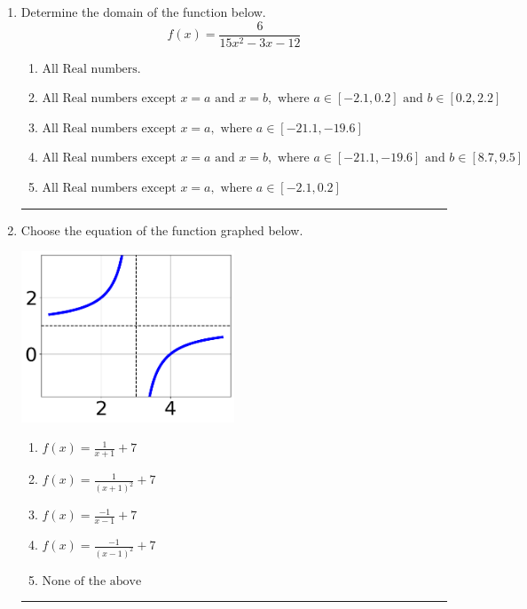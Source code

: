 \documentclass[14pt]{extbook}
\newcommand{\litem}[1]{\item#1\hspace*{-1cm}\rule{\textwidth}{0.4pt}}
\begin{document}
\begin{enumerate}
{\begin{enumerate}[label=\Alph*.]
\end{enumerate} }
\litem{
Determine the domain of the function below.\[ f(x) = \frac{6}{15x^{2} -3 x -12} \]\begin{enumerate}[label=\Alph*.]
\item \( \text{All Real numbers.} \)
\item \( \text{All Real numbers except } x = a \text{ and } x = b, \text{ where } a \in [-2.1, 0.2] \text{ and } b \in [0.2, 2.2] \)
\item \( \text{All Real numbers except } x = a, \text{ where } a \in [-21.1, -19.6] \)
\item \( \text{All Real numbers except } x = a \text{ and } x = b, \text{ where } a \in [-21.1, -19.6] \text{ and } b \in [8.7, 9.5] \)
\item \( \text{All Real numbers except } x = a, \text{ where } a \in [-2.1, 0.2] \)

\end{enumerate} }
\litem{
Choose the equation of the function graphed below.
\begin{center}
    \includegraphics[width=0.5\textwidth]{../Figures/rationalGraphToEquationCopyA.png}
\end{center}
\begin{enumerate}[label=\Alph*.]
\item \( f(x) = \frac{1}{x + 1} + 7 \)
\item \( f(x) = \frac{1}{(x + 1)^2} + 7 \)
\item \( f(x) = \frac{-1}{x - 1} + 7 \)
\item \( f(x) = \frac{-1}{(x - 1)^2} + 7 \)
\item \( \text{None of the above} \)


\end{enumerate}}
\end{enumerate}
\end{document}
